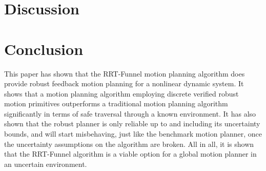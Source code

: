 \documentclass[conference]{IEEEtran}
\newcommand{\rrtfunnel}{RRT-Funnel}
\newcommand{\0}{\mathbf{0}}
\newcommand{\1}{\mathbf{1}}
\begin{document}
\section{Discussion}


\section{Conclusion}

This paper has shown that the \rrtfunnel{} motion planning algorithm does
provide robust feedback motion planning for a nonlinear dynamic system. It shows
that a motion planning algorithm employing discrete verified robust motion
primitives outperforms a traditional motion planning algorithm significantly in
terms of safe traversal through a known environment. It has also shown that the
robust planner is only reliable up to and including its uncertainty bounds, and
will start misbehaving, just like the benchmark motion planner, once the
uncertainty assumptions on the algorithm are broken. All in all, it is shown
that the \rrtfunnel{} algorithm is a viable option for a global motion planner
in an uncertain environment.

\balance




%
%
\end{document}
